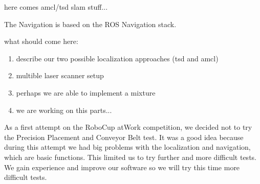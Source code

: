 here comes amcl/tsd slam stuff...

The Navigation is based on the ROS Navigation stack.

what should come here:
\begin{enumerate}
	\item describe our two possible localization approaches (tsd and amcl)
	\item multible laser scanner setup
	\item perhaps we are able to implement a mixture
	\item we are working on this parts...
\end{enumerate}

As a first attempt on the RoboCup atWork  competition, we decided not to try the Precision Placement and Conveyor Belt test. It was a good idea because during this attempt we had big problems with the localization and navigation, which are basic functions. This limited us to try further and more difficult tests. We gain experience and improve our software so we will try this time more difficult tests.

